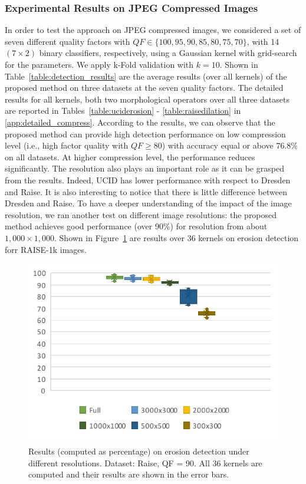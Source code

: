 \documentclass{ieeeaccess}
\begin{document}
\subsubsection{Experimental Results on JPEG Compressed Images}
%
In order to test the approach on JPEG compressed images, we considered a set of seven different quality factors with $QF \in \{100,95,90,85,80,75,70\}$, with 14 $(7\times 2)$ binary classifiers, respectively,
using a Gaussian kernel with grid-search for the parameters. We apply k-Fold validation with $k = 10$. Shown in Table~\ref{table:detection_results} are the average results (over all kernels) of the proposed method on three datasets at the seven quality factors. The detailed results for all kernels, both two morphological operators over all three datasets are reported in Tables~\ref{table:uciderosion} - \ref{table:raisedilation} in \ref{app:detailed_compress}. According to the results, we can observe that the proposed method can provide high detection performance on low compression level (i.e., high factor quality with $QF \ge 80$) with accuracy equal or above $76.8\%$ on all datasets. At higher compression level, the performance reduces significantly. The resolution also plays an important role as it can be grasped from the results. Indeed, UCID has lower performance with respect to Dresden and Raise. It is also interesting to notice that there is little difference between Dresden and Raise. To have a deeper understanding of the impact of the image resolution, we ran another test on different image resolutions: the proposed method achieves good performance (over 90\%) for resolution from about $1,000 \times 1,000$. Shown in Figure~\ref{fig:resolutions} are results over 36 kernels on erosion detection forr RAISE-1k images.%

\begin{figure}[h!]
	\centering
	\includegraphics[width=\linewidth]{resolutions.pdf}
	\caption{Results (computed as percentage) on erosion detection under different resolutions. Dataset: Raise, QF = 90. All 36 kernels are computed and their results are shown in the error bars.}
	\label{fig:resolutions}
\end{figure}
\end{document}
